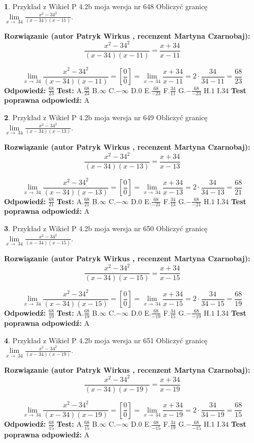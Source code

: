 \documentclass[12pt, a4paper]{article}
\theoremstyle{definition} %
\newtheorem{zad}{}
\newcommand{\zadStart}[1]{\begin{zad}#1\newline}
\newcommand{\zadStop}{\end{zad}}
\newcommand{\rozwStart}[2]{\noindent \textbf{Rozwiązanie (autor #1 , recenzent #2): }\newline}
\newcommand{\rozwStop}{\newline}
\newcommand{\odpStart}{\noindent \textbf{Odpowiedź:}\newline}
\newcommand{\odpStop}{\newline}
\newcommand{\testStart}{\noindent \textbf{Test:}\newline}
\newcommand{\testStop}{\newline}
\newcommand{\kluczStart}{\noindent \textbf{Test poprawna odpowiedź:}\newline}
\newcommand{\kluczStop}{\newline}
\begin{document}
\zadStart{Przykład z Wikieł P 4.2b moja wersja nr 648}
Obliczyć granicę $\lim\limits_{x\to\ 34}\frac{x^{2}-34^{2}}{(x-34)(x-11)}$.
\zadStop
\rozwStart{Patryk Wirkus}{Martyna Czarnobaj}
$$\frac{x^{2}-34^{2}}{(x-34)(x-11)}=\frac{x+34}{x-11}$$

$$\lim\limits_{x\to\ 34}\frac{x^{2}-34^{2}}{(x-34)(x-11)}=[\frac{0}{0}]=\lim\limits_{x\to\ 34}\frac{x+34}{x-11}=2 \cdot \frac{34}{34-11} = \frac{68}{23}$$
\rozwStop
\odpStart
$\frac{68}{23}$
\odpStop
\testStart
A.$\frac{68}{23}$
B.$\infty$
C.$-\infty$
D.$0$
E.$\frac{68}{-23}$
F.$\frac{34}{11}$
G.$-\frac{68}{-23}$
H.$1$
I.$34$
\testStop
\kluczStart
A
\kluczStop



\zadStart{Przykład z Wikieł P 4.2b moja wersja nr 649}
Obliczyć granicę $\lim\limits_{x\to\ 34}\frac{x^{2}-34^{2}}{(x-34)(x-13)}$.
\zadStop
\rozwStart{Patryk Wirkus}{Martyna Czarnobaj}
$$\frac{x^{2}-34^{2}}{(x-34)(x-13)}=\frac{x+34}{x-13}$$

$$\lim\limits_{x\to\ 34}\frac{x^{2}-34^{2}}{(x-34)(x-13)}=[\frac{0}{0}]=\lim\limits_{x\to\ 34}\frac{x+34}{x-13}=2 \cdot \frac{34}{34-13} = \frac{68}{21}$$
\rozwStop
\odpStart
$\frac{68}{21}$
\odpStop
\testStart
A.$\frac{68}{21}$
B.$\infty$
C.$-\infty$
D.$0$
E.$\frac{68}{-21}$
F.$\frac{34}{13}$
G.$-\frac{68}{-21}$
H.$1$
I.$34$
\testStop
\kluczStart
A
\kluczStop



\zadStart{Przykład z Wikieł P 4.2b moja wersja nr 650}
Obliczyć granicę $\lim\limits_{x\to\ 34}\frac{x^{2}-34^{2}}{(x-34)(x-15)}$.
\zadStop
\rozwStart{Patryk Wirkus}{Martyna Czarnobaj}
$$\frac{x^{2}-34^{2}}{(x-34)(x-15)}=\frac{x+34}{x-15}$$

$$\lim\limits_{x\to\ 34}\frac{x^{2}-34^{2}}{(x-34)(x-15)}=[\frac{0}{0}]=\lim\limits_{x\to\ 34}\frac{x+34}{x-15}=2 \cdot \frac{34}{34-15} = \frac{68}{19}$$
\rozwStop
\odpStart
$\frac{68}{19}$
\odpStop
\testStart
A.$\frac{68}{19}$
B.$\infty$
C.$-\infty$
D.$0$
E.$\frac{68}{-19}$
F.$\frac{34}{15}$
G.$-\frac{68}{-19}$
H.$1$
I.$34$
\testStop
\kluczStart
A
\kluczStop



\zadStart{Przykład z Wikieł P 4.2b moja wersja nr 651}
Obliczyć granicę $\lim\limits_{x\to\ 34}\frac{x^{2}-34^{2}}{(x-34)(x-19)}$.
\zadStop
\rozwStart{Patryk Wirkus}{Martyna Czarnobaj}
$$\frac{x^{2}-34^{2}}{(x-34)(x-19)}=\frac{x+34}{x-19}$$

$$\lim\limits_{x\to\ 34}\frac{x^{2}-34^{2}}{(x-34)(x-19)}=[\frac{0}{0}]=\lim\limits_{x\to\ 34}\frac{x+34}{x-19}=2 \cdot \frac{34}{34-19} = \frac{68}{15}$$
\rozwStop
\odpStart
$\frac{68}{15}$
\odpStop
\testStart
A.$\frac{68}{15}$
B.$\infty$
C.$-\infty$
D.$0$
E.$\frac{68}{-15}$
F.$\frac{34}{19}$
G.$-\frac{68}{-15}$
H.$1$
I.$34$
\testStop
\kluczStart
A
\kluczStop
\end{document}

